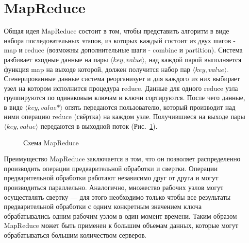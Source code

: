 \section*{MapReduce}
\label{sec:mapred}
Общая идея MapReduce состоит в том, чтобы представить алгоритм в виде набора последовательных этапов, из которых каждый состоит из двух шагов - map и reduce (возможны дополнительные шаги - combine и partition). Система разбивает входные данные на пары $\langle key, value\rangle$, над каждой парой выполняется функция map на выходе которой, должен получится набор пар $\langle key, value\rangle$. 
Сгенерированные данные система реорганизует и для каждого из них выбирает узел на котором исполнится процедура reduce. Данные для одного reduce узла группируются по одинаковым ключам и ключи сортируются. После чего данные, в виде $\langle key, value*\rangle$ опять передаются пользователю, который производит над ними операцию reduce (свёртка) на каждом узле. Получившиеся на выходе пары $\langle key, value\rangle$ передаются в выходной поток (Рис.~\ref{ris:mapreduce}).
  \begin{figure}[h]
    \caption{Схема MapReduce\cite{pimenov} }
    \label{ris:mapreduce}
  \end{figure}

Преимущество MapReduce заключается в том, что он позволяет распределенно производить операции предварительной обработки и свертки. Операции предварительной обработки работают независимо друг от друга и могут производиться параллельно. Аналогично, множество рабочих узлов могут осуществлять свертку — для этого необходимо только чтобы все результаты предварительной обработки с одним конкретным значением ключа обрабатывались одним рабочим узлом в один момент времени. Таким образом MapReduce может быть применен к большим объемам данных, которые могут обрабатываться большим количеством серверов.\cite{hadoop}
